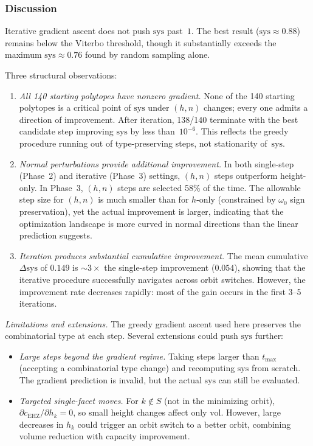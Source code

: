 \subsubsection*{Discussion}

Iterative gradient ascent does not push $\mathrm{sys}$ past~$1$.
The best result ($\mathrm{sys} \approx 0.88$) remains below the
Viterbo threshold, though it substantially exceeds the maximum
$\mathrm{sys} \approx 0.76$ found by random sampling alone.

Three structural observations:
\begin{enumerate}
\item \emph{All 140 starting polytopes have nonzero gradient.}
  None of the 140 starting polytopes is a critical point of $\mathrm{sys}$
  under $(h,n)$ changes; every one admits a direction of improvement.
  After iteration, 138/140 terminate with the best candidate step
  improving $\mathrm{sys}$ by less than~$10^{-6}$.
  This reflects the greedy procedure running out of type-preserving
  steps, not stationarity of~$\mathrm{sys}$.

\item \emph{Normal perturbations provide additional improvement.}
  In both single-step (Phase~2) and iterative (Phase~3) settings,
  $(h,n)$ steps outperform height-only.
  In Phase~3, $(h,n)$ steps are selected 58\% of the time.
  The allowable step size for $(h,n)$ is much smaller than for $h$-only
  (constrained by $\omega_0$ sign preservation), yet the
  actual improvement is larger, indicating that the optimization landscape
  is more curved in normal directions than the linear prediction suggests.

\item \emph{Iteration produces substantial cumulative improvement.}
  The mean cumulative $\Delta\mathrm{sys}$ of $0.149$ is ${\sim}3\times$
  the single-step improvement ($0.054$), showing that the iterative
  procedure successfully navigates across orbit switches.
  However, the improvement rate decreases rapidly: most of the gain
  occurs in the first 3--5 iterations.
\end{enumerate}

\emph{Limitations and extensions.}
The greedy gradient ascent used here preserves the combinatorial type at
each step. Several extensions could push $\mathrm{sys}$ further:
\begin{itemize}
\item \emph{Large steps beyond the gradient regime.}
  Taking steps larger than $t_{\max}$ (accepting a combinatorial type
  change) and recomputing $\mathrm{sys}$ from scratch.
  The gradient prediction is invalid, but the actual $\mathrm{sys}$ can
  still be evaluated.
\item \emph{Targeted single-facet moves.}
  For $k \notin S$ (not in the minimizing orbit), $\partial c_{\mathrm{EHZ}}/\partial h_k = 0$,
  so small height changes affect only $\mathrm{vol}$.
  However, large decreases in $h_k$ could trigger an orbit switch to a
  better orbit, combining volume reduction with capacity improvement.
\end{itemize}

